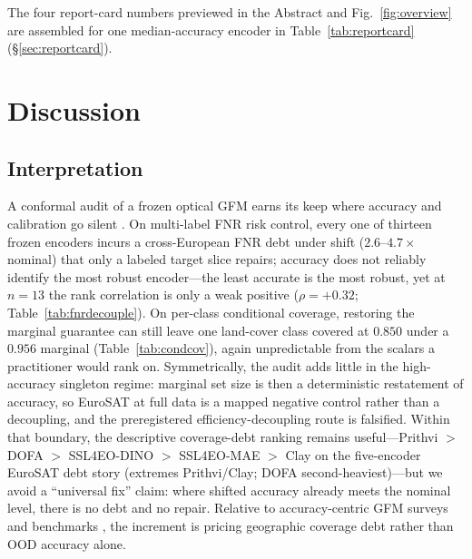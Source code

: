 \documentclass[preprint,11pt,authoryear]{elsarticle}
\begin{document}
The four report-card numbers previewed in the Abstract and Fig.~\ref{fig:overview} are assembled
for one median-accuracy encoder in Table~\ref{tab:reportcard} (\S\ref{sec:reportcard}).


\section{Discussion}\label{sec:discussion}

\subsection{Interpretation}
A conformal audit of a frozen optical GFM earns its keep where accuracy and calibration go silent
\citep{guo2017calibration,ovadia2019uncertainty}. On multi-label FNR risk control, every one of
thirteen frozen encoders incurs a cross-European FNR debt under shift ($2.6$--$4.7\times$ nominal) that
only a labeled target slice repairs; accuracy does not reliably identify the most robust
encoder---the least accurate is the most robust, yet at $n{=}13$ the rank correlation is only a weak
positive ($\rho{=}+0.32$; Table~\ref{tab:fnrdecouple}). On per-class conditional coverage, restoring the
marginal guarantee can still leave one land-cover class covered at $0.850$ under a $0.956$ marginal
(Table~\ref{tab:condcov}), again unpredictable from the scalars a practitioner would rank on.
Symmetrically, the audit adds little in the high-accuracy singleton regime: marginal set size is then a
deterministic restatement of accuracy, so EuroSAT at full data is a mapped negative control rather than
a decoupling, and the preregistered efficiency-decoupling route is falsified. Within that boundary, the
descriptive coverage-debt ranking remains useful---Prithvi $>$ DOFA $>$ SSL4EO-DINO $>$ SSL4EO-MAE $>$ Clay
on the five-encoder EuroSAT debt story (extremes Prithvi/Clay; DOFA second-heaviest)---but we avoid a
``universal fix'' claim: where shifted accuracy already meets the nominal level, there is no debt and no
repair. Relative to accuracy-centric GFM surveys and benchmarks
\citep{xiao2025rsfm,lacoste2023geobench,ghamisi2025sustainfm}, the increment is pricing geographic
coverage debt rather than OOD accuracy alone.
\end{document}
